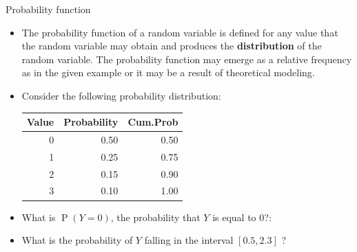 \documentclass[10pt]{beamer}\usepackage[]{graphicx}\usepackage[]{color}
\newenvironment{knitrout}{}{} %
\newcommand{\Prob}{\operatorname{P}}
\begin{document}
\begin{frame}[fragile]{Probability function}
	\small
	\begin{itemize}
		
		\item The probability function of a random variable is defined for any value
		that the random variable may obtain and produces the \textbf{distribution} of
		the random variable. The probability function may emerge as a relative
		frequency as in the given example or it may be a result of theoretical
		modeling.
		
		\item Consider the following probability distribution:
		
\begin{knitrout}\small
{}\color{fgcolor}
\begin{tabular}{rrr}
\toprule
Value & Probability & Cum.Prob\\
\midrule
0 & 0.50 & 0.50\\
1 & 0.25 & 0.75\\
2 & 0.15 & 0.90\\
3 & 0.10 & 1.00\\
\bottomrule
\end{tabular}

\end{knitrout}
		
		\item What is $\Prob(Y=0)$, the probability that $Y$ is equal to 0?:
		
		\item What is the probability of $Y$ falling in the interval $[0.5, 2.3]$ ?
		
		
	\end{itemize}
	
\end{frame}
\end{document}
